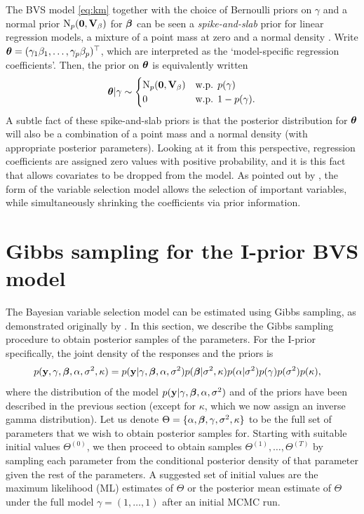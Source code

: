 \documentclass[showframe,11pt,twoside,openright]{report}
\begin{document}
\begin{remark}
  The BVS model \cref{eq:km} together with the choice of Bernoulli priors on $\gamma$ and a normal prior $\operatorname{N}_p({\mathbf 0},{\mathbf V}_\beta)$ for ${\bm\beta}$ can be seen a \emph{spike-and-slab} prior for linear regression models, a mixture of a point mass at zero and a normal density \citep{mitchell1988bayesian,geweke1996variable}.
  Write ${\bm\theta} = (\gamma_1\beta_1,\dots,\gamma_p\beta_p)^\top$, which are interpreted as the `model-specific regression coefficients'.
  Then, the prior on ${\bm\theta}$ is equivalently written
  \[
    {\bm\theta}|\gamma \sim
    \begin{cases}
      \operatorname{N}_p({\mathbf 0},{\mathbf V}_\beta) & \text{w.p. } p(\gamma) \\
      0 & \text{w.p. } 1 - p(\gamma).
    \end{cases}
  \]
  A subtle fact of these spike-and-slab priors is that the posterior distribution for ${\bm\theta}$ will also be a combination of a point mass and a normal density (with appropriate posterior parameters).
  Looking at it from this perspective, regression coefficients are assigned zero values with positive probability, and it is this fact that allows covariates to be dropped from the model.
  As pointed out by \citet{Kuo1998}, the form of the variable selection model allows the selection of important variables, while simultaneously shrinking the coefficients via prior information.
\end{remark}

\section{Gibbs sampling for the I-prior BVS model}

The Bayesian variable selection model can be estimated using Gibbs sampling, as demonstrated originally by \citet{Kuo1998}.
In this section, we describe the Gibbs sampling procedure to obtain posterior samples of the parameters.
For the I-prior specifically, the joint density of the responses and the priors is 
\begin{align*}
  p({\mathbf y},\gamma,{\bm\beta},\alpha,\sigma^2,\kappa)
  &= p({\mathbf y}|\gamma,{\bm\beta},\alpha,\sigma^2)p({\bm\beta}|\sigma^2,\kappa)p(\alpha|\sigma^2)p(\gamma)p(\sigma^2)p(\kappa),
\end{align*}
where the distribution of the model $p({\mathbf y}|\gamma,{\bm\beta},\alpha,\sigma^2)$ and of the priors have been described in the previous section (except for $\kappa$, which we now assign an inverse gamma distribution).
Let us denote $\Theta=\{\alpha,{\bm\beta},\gamma,\sigma^2,\kappa\}$ to be the full set of parameters that we wish to obtain posterior samples for.
Starting with suitable initial values $\Theta^{(0)}$, we then proceed to obtain samples $\Theta^{(1)}, \dots, \Theta^{(T)}$ by sampling each parameter from the conditional posterior density of that parameter given the rest of the parameters.
A suggested set of initial values are the maximum likelihood (ML) estimates of $\Theta$ or the posterior mean estimate of $\Theta$ under the full model $\gamma=(1,\dots,1)$ after an initial MCMC run.
\end{document}

